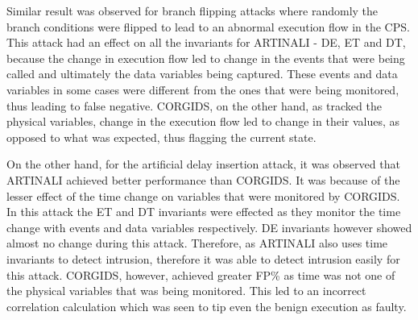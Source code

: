 Similar result was observed for branch flipping attacks where randomly the branch conditions were flipped to lead to an abnormal execution flow in the CPS. This attack had an effect on all the invariants for ARTINALI -  D\textbar E, E\textbar T and D\textbar T, because the change in execution flow led to change in the events that were being called and ultimately the data variables being captured. These events and data variables in some cases were different from the ones that were being monitored, thus leading to false negative. CORGIDS, on the other hand, as tracked the physical variables, change in the execution flow led to change in their values, as opposed to what was expected, thus flagging the current state.

On the other hand, for the artificial delay insertion attack, it was observed that ARTINALI achieved better performance than CORGIDS. It was because of the lesser effect of the time change on variables that were monitored by CORGIDS. In this attack the E\textbar T and D\textbar T invariants were effected as they monitor the time change with events and data variables respectively. D\textbar E invariants however showed almost no change during this attack. Therefore, as ARTINALI also uses time invariants to detect intrusion, therefore it was able to detect intrusion easily for this attack. CORGIDS, however, achieved greater FP\% as time was not one of the physical variables that was being monitored. This led to an incorrect correlation calculation which was seen to tip even the benign execution as faulty.



\endinput
